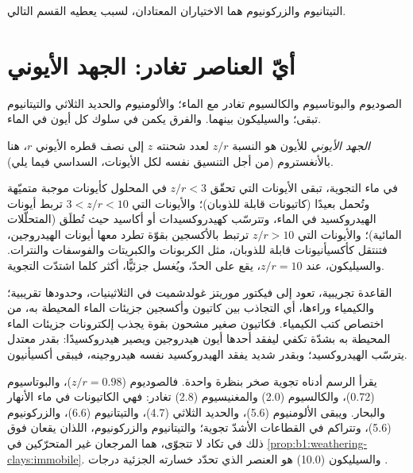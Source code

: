 التيتانيوم والزركونيوم هما الاختياران المعتادان، لسبب يعطيه القسم التالي.

\section{أيّ العناصر تغادر: الجهد الأيوني}\label{sec:b1:weathering-clays:ionic}

الصوديوم والبوتاسيوم والكالسيوم تغادر مع الماء؛ والألومنيوم والحديد الثلاثي والتيتانيوم تبقى؛ والسيليكون بينهما. والفرق يكمن في سلوك كل أيون في الماء.

\begin{definition}\label{def:b1:weathering-clays:ionic-potential}
\emph{الجهد الأيوني} للأيون هو النسبة $z/r$ لعدد شحنته $z$ إلى نصف قطره الأيوني $r$، هنا بالأنغستروم (من أجل التنسيق نفسه لكل الأيونات، السداسي فيما يلي).
\end{definition}

\begin{proposition}\label{prop:b1:weathering-clays:fields}
في ماء التجوية، تبقى الأيونات التي تحقّق $z/r < 3$ في المحلول كأيونات موجبة متميّهة وتُحمل بعيدًا (كاتيونات قابلة للذوبان)؛ والأيونات التي $3 < z/r < 10$ تربط أيونات الهيدروكسيد في الماء، وتترسّب كهيدروكسيدات أو أكاسيد حيث تُطلَق (المتحلّلات المائية)؛ والأيونات التي $z/r > 10$ ترتبط بالأكسجين بقوّة تطرد معها أيونات الهيدروجين، فتنتقل كأكسيأنيونات قابلة للذوبان، مثل الكربونات والكبريتات والفوسفات والنترات. والسيليكون، عند $z/r = 10$، يقع على الحدّ، ويُغسل جزئيًّا، أكثر كلما اشتدّت التجوية.
\end{proposition}
\admitted

القاعدة تجريبية، تعود إلى فيكتور موريتز غولدشميت في الثلاثينيات، وحدودها تقريبية؛ والكيمياء وراءها، أي التجاذب بين كاتيون وأكسجين جزيئات الماء المحيطة به، من اختصاص كتب الكيمياء. فكاتيون صغير مشحون بقوة يجذب إلكترونات جزيئات الماء المحيطة به بشدّة تكفي ليفقد أحدها أيون هيدروجين ويصير هيدروكسيدًا: بقدر معتدل يترسّب الهيدروكسيد؛ وبقدر شديد يفقد الهيدروكسيد نفسه هيدروجينه، فيبقى أكسيأنيون.

يقرأ الرسم أدناه تجوية صخر بنظرة واحدة. فالصوديوم ($z/r = 0.98$)، والبوتاسيوم (0.72)، والكالسيوم (2.0) والمغنيسيوم (2.8) تغادر: فهي الكاتيونات في ماء الأنهار والبحار. ويبقى الألومنيوم (5.6)، والحديد الثلاثي (4.7)، والتيتانيوم (6.6)، والزركونيوم (5.6)، وتتراكم في القطاعات الأشدّ تجوية؛ والتيتانيوم والزركونيوم، اللذان يقعان فوق ذلك في  تكاد لا تتجوّى، هما المرجعان غير المتحرّكين في \cref{prop:b1:weathering-clays:immobile}. والسيليكون (10.0) هو العنصر الذي تحدّد خسارته الجزئية درجات .

